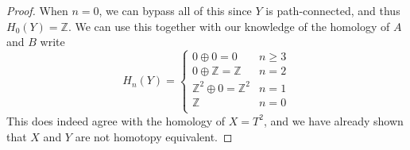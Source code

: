 \documentclass[12pt]{article}
\theoremstyle{definition}
\begin{document}
\begin{proof}
	When $n = 0$, we can bypass all of this since $Y$ is path-connected, and thus $H_0(Y) = \mathbb{Z}$.
	We can use this together with our knowledge of the homology of $A$ and $B$ write \begin{equation*}
		H_n(Y) = \begin{cases}
			0 \oplus 0 = 0                       & n \geq 3 \\
			0 \oplus \mathbb{Z} = \mathbb{Z}     & n = 2    \\
			\mathbb{Z}^2 \oplus 0 = \mathbb{Z}^2 & n = 1    \\
			\mathbb{Z}                           & n = 0    \\
		\end{cases}
	\end{equation*}
  This does indeed agree with the homology of $X = T^2$, and we have already shown that $X$ and $Y$ are not homotopy equivalent.
\end{proof}
\end{document}
